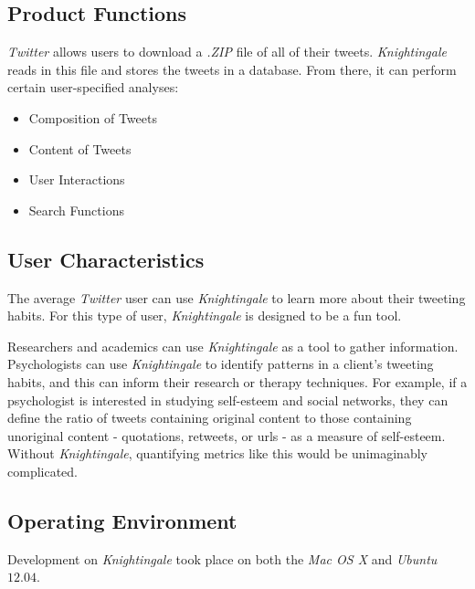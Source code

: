 \documentclass[a4paper, 12pt]{article}
\begin{document}
\subsection{Product Functions} \label{sec:functions}
\begin{adjustwidth}{2em}{0pt}
\textit{Twitter} allows users to download a \textit{.ZIP} file of all of their tweets. \textit{Knightingale} reads in this file and stores the tweets in a database. From there, it can perform certain user-specified analyses:
\begin{itemize}
\item Composition of Tweets
\item Content of Tweets
\item User Interactions
\item Search Functions
\end{itemize}
\end{adjustwidth}

\subsection{User Characteristics} \label{sec:userc}
\begin{adjustwidth}{2em}{0pt}
The average \textit{Twitter} user can use \textit{Knightingale} to learn more about their tweeting habits. For this type of user, \textit{Knightingale} is designed to be a fun tool. \newline

\noindent Researchers and academics can use \textit{Knightingale} as a tool to gather information. Psychologists can use \textit{Knightingale} to identify patterns in a client's tweeting habits, and this can inform their research or therapy techniques. For example, if a psychologist is interested in studying self-esteem and social networks, they can define the ratio of tweets containing original content to those containing unoriginal content - quotations, retweets, or urls - as a measure of self-esteem. Without \textit{Knightingale}, quantifying metrics like this would be unimaginably complicated.
\end{adjustwidth}

\subsection{Operating Environment} \label{sec:operating}
\begin{adjustwidth}{2em}{0pt}
Development on \textit{Knightingale} took place on both the \textit{Mac OS X} and \textit{Ubuntu} $12.04$.
\end{adjustwidth}
\end{document}
